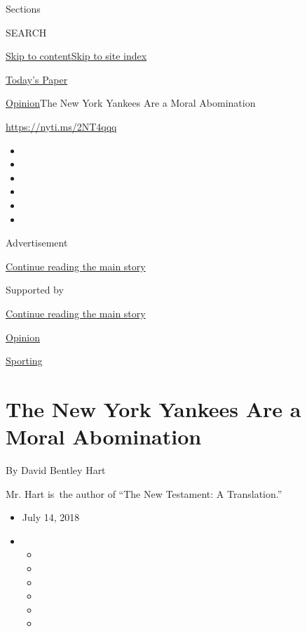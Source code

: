 Sections

SEARCH

\protect\hyperlink{site-content}{Skip to
content}\protect\hyperlink{site-index}{Skip to site index}

\href{https://myaccount.nytimes3xbfgragh.onion/auth/login?response_type=cookie\&client_id=vi}{}

\href{https://www.nytimes3xbfgragh.onion/section/todayspaper}{Today's
Paper}

\href{/section/opinion}{Opinion}\textbar{}The New York Yankees Are a
Moral Abomination

\url{https://nyti.ms/2NT4qqq}

\begin{itemize}
\item
\item
\item
\item
\item
\item
\end{itemize}

Advertisement

\protect\hyperlink{after-top}{Continue reading the main story}

Supported by

\protect\hyperlink{after-sponsor}{Continue reading the main story}

\href{/section/opinion}{Opinion}

\href{/column/sporting}{Sporting}

\hypertarget{the-new-york-yankees-are-a-moral-abomination}{%
\section{The New York Yankees Are a Moral
Abomination}\label{the-new-york-yankees-are-a-moral-abomination}}

By David Bentley Hart

Mr. Hart is~the author of ``The New Testament: A Translation.''

\begin{itemize}
\item
  July 14, 2018
\item
  \begin{itemize}
  \item
  \item
  \item
  \item
  \item
  \item
  \end{itemize}
\end{itemize}

